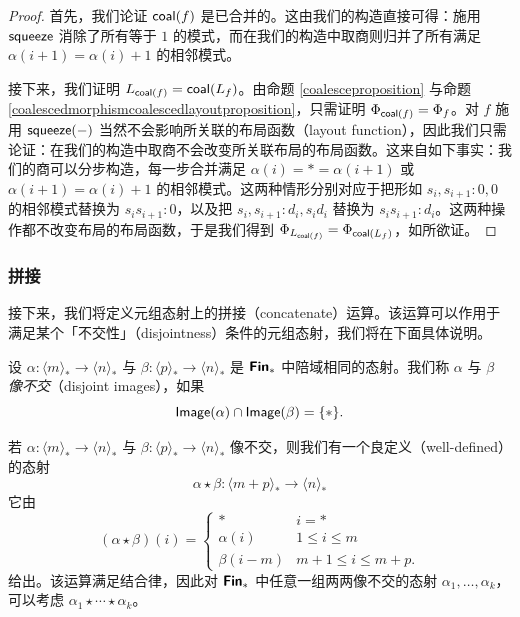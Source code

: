 \begin{proof}
首先，我们论证 $\mathsf{coal}(f)$ 是已合并的。这由我们的构造直接可得：施用 $\mathsf{squeeze}$ 消除了所有等于 $1$ 的模式，而在我们的构造中取商则归并了所有满足 $\alpha(i+1) = \alpha(i)+1$ 的相邻模式。

    接下来，我们证明 $L_{\mathsf{coal}(f)} = \mathsf{coal}(L_f)$。由命题 \ref{coalesceproposition} 与命题 \ref{coalescedmorphismcoalescedlayoutproposition}，只需证明 $\Phi_{\mathsf{coal}(f)} = \Phi_f$。对 $f$ 施用 $\mathsf{squeeze}(-)$ 当然不会影响所关联的布局函数（layout function），因此我们只需论证：在我们的构造中取商不会改变所关联布局的布局函数。这来自如下事实：我们的商可以分步构造，每一步合并满足 $\alpha(i) = * = \alpha(i+1)$ 或 $\alpha(i+1) = \alpha(i) + 1$ 的相邻模式。这两种情形分别对应于把形如 $s_i,s_{i+1}:0,0$ 的相邻模式替换为 $s_is_{i+1}:0$，以及把 $s_i,s_{i+1}:d_i,s_id_i$ 替换为 $s_is_{i+1}:d_i$。这两种操作都不改变布局的布局函数，于是我们得到 $\Phi_{L_{\mathsf{coal}(f)}} = \Phi_{\mathsf{coal}(L_f)}$，如所欲证。
\end{proof}


\subsubsection{拼接}
\label{subsubsection.concatenate}

接下来，我们将定义元组态射上的拼接（concatenate）运算。该运算可以作用于满足某个「不交性」（disjointness）条件的元组态射，我们将在下面具体说明。

\begin{definition}\label{definitionofdisjointimagesinFin*}
    设 $\alpha:\langle m \rangle_* \to \langle n \rangle_*$ 与 $\beta:\langle p \rangle_* \to \langle n \rangle_*$ 是 ${\boldsymbol{\mathsf{Fin}}}_*$ 中陪域相同的态射。我们称 $\alpha$ 与 $\beta$ {\it 像不交}（disjoint images），如果
    \[
    \mathsf{Image}(\alpha) \cap \mathsf{Image}(\beta) = \{*\}.
    \]
\end{definition}

\begin{construction}
    若 $\alpha:\langle m \rangle_* \to \langle n \rangle_*$ 与 $\beta: \langle p \rangle_* \to \langle n \rangle_*$ 像不交，则我们有一个良定义（well-defined）的态射
    \[
    \alpha \star \beta: \langle m + p \rangle_* \to \langle n\rangle_*
    \]
    它由
    \[
    (\alpha \star \beta)(i) = \begin{cases}
    * & i = *\\
        \alpha(i) & 1 \leq i \leq m\\
        \beta(i-m) & m+1 \leq i \leq m+p.
    \end{cases}
    \]
    给出。该运算满足结合律，因此对 ${\boldsymbol{\mathsf{Fin}}}_*$ 中任意一组两两像不交的态射 $\alpha_1,\dots,\alpha_k$，可以考虑 $\alpha_1 \star \cdots \star \alpha_k$。
\end{construction}

